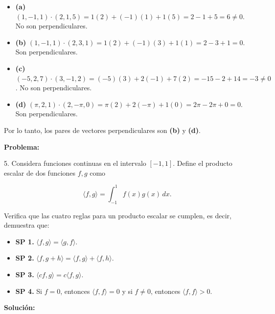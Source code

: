 \begin{itemize}
    \item \textbf{(a)} $(1, -1, 1) \cdot (2, 1, 5) = 1(2) + (-1)(1) + 1(5) = 2 - 1 + 5 = 6 \neq 0$. No son perpendiculares.
    \item \textbf{(b)} $(1, -1, 1) \cdot (2, 3, 1) = 1(2) + (-1)(3) + 1(1) = 2 - 3 + 1 = 0$. Son perpendiculares.
    \item \textbf{(c)} $(-5, 2, 7) \cdot (3, -1, 2) = (-5)(3) + 2(-1) + 7(2) = -15 - 2 + 14 = -3 \neq 0$. No son perpendiculares.
    \item \textbf{(d)} $(\pi, 2, 1) \cdot (2, -\pi, 0) = \pi(2) + 2(-\pi) + 1(0) = 2\pi - 2\pi + 0 = 0$. Son perpendiculares.
\end{itemize}

Por lo tanto, los pares de vectores perpendiculares son \textbf{(b)} y \textbf{(d)}.

\textbf{Problema:}

5. Considera funciones continuas en el intervalo $[-1, 1]$. Define el producto escalar de dos funciones $f, g$ como

\[
    \langle f, g \rangle = \int_{-1}^{1} f(x)g(x) \, dx.
\]

Verifica que las cuatro reglas para un producto escalar se cumplen, es decir, demuestra que:

\begin{itemize}
    \item \textbf{SP 1.} $\langle f, g \rangle = \langle g, f \rangle$.
    \item \textbf{SP 2.} $\langle f, g + h \rangle = \langle f, g \rangle + \langle f, h \rangle$.
    \item \textbf{SP 3.} $\langle cf, g \rangle = c \langle f, g \rangle$.
    \item \textbf{SP 4.} Si $f = 0$, entonces $\langle f, f \rangle = 0$ y si $f \neq 0$, entonces $\langle f, f \rangle > 0$.
\end{itemize}

\textbf{Solución:}

